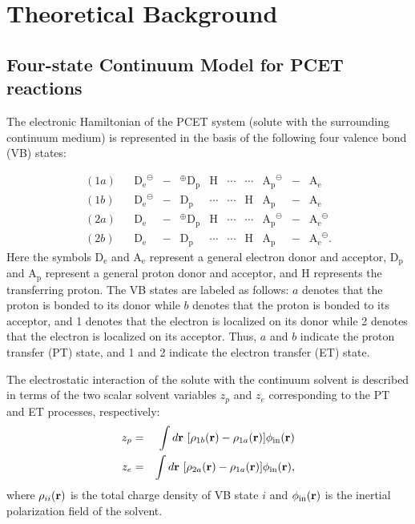 \documentclass[oneside,11pt,openany]{book}
\begin{document}
\chapter{Theoretical Background}

\section{Four-state Continuum Model for PCET reactions}

The electronic Hamiltonian of the PCET system (solute with
the surrounding continuum medium) is represented in the basis
of the following four valence bond (VB) states:

\begin{equation}
\begin{array}{lllcrlcrlcl}
(1a)&&\mbox{D$_{{\mathrm e}}$}^\ominus&-&^\oplus\mbox{D$_{{\mathrm p}}$}&\mbox{H}&\cdots
&\cdots&\mbox{A$_{{\mathrm p}}$}^\ominus&-&\mbox{A$_{{\mathrm e}}$} \\
(1b)&&\mbox{D$_{{\mathrm e}}$}^\ominus&-&\mbox{D$_{{\mathrm p}}$}&\cdots
&\cdots&\mbox{H}&\mbox{A$_{{\mathrm p}}$}
&-&\mbox{A$_{{\mathrm e}}$} \\
(2a)&&\mbox{D$_{{\mathrm e}}$}&-&^\oplus\mbox{D$_{{\mathrm p}}$}&\mbox{H}
&\cdots&\cdots&\mbox{A$_{{\mathrm p}}$}^\ominus&-&\mbox{A$_{{\mathrm e}}$}^\ominus \\
(2b)&&\mbox{D$_{{\mathrm e}}$}&-&\mbox{D$_{{\mathrm p}}$}&\cdots&\cdots&
\mbox{H}&\mbox{A$_{{\mathrm p}}$}&-&\mbox{A$_{{\mathrm e}}$}^\ominus.
\end{array}
\label{eq.definepcetvb}
\end{equation}
%
Here the symbols D$_{\mathrm e}$ and A$_{\mathrm e}$ represent
a general electron donor and acceptor,
D$_{\mathrm p}$ and A$_{\mathrm p}$ represent
a general proton donor and acceptor, and H represents the transferring
proton. The VB states are labeled as follows:
$a$ denotes that the proton is bonded to its donor while
$b$ denotes that the proton is
bonded to its acceptor, and
1 denotes that the electron is localized on its donor while
2 denotes that the electron is localized on its acceptor.
Thus, $a$ and $b$ indicate the proton transfer (PT) state, and
1 and 2 indicate the electron transfer (ET) state.

The electrostatic interaction of the solute with the continuum
solvent is described in terms of the two scalar solvent variables
$z_p$ and $z_e$ corresponding to the PT and ET processes,
respectively:
\begin{eqnarray}
z_p &=& \int d{\bf r}\,\,[\rho_{1b}({\bf r})-\rho_{1a}({\bf r})]
\phi_{\mathrm{in}}({\bf r}) \nonumber \\
z_e &=& \int d{\bf r}\,\,[\rho_{2a}({\bf r})-\rho_{1a}({\bf r})]
\phi_{\mathrm{in}}({\bf r}),
\end{eqnarray}
where $\rho_{ii}({\bf r})$ is the total charge density
of VB state $i$ and $\phi_{\mathrm{in}}({\bf r})$ is the inertial
polarization field of the solvent.
\end{document}
